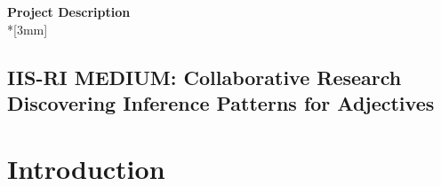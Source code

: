 \documentclass[10pt]{article}
\begin{document}
\begin{center}
{\LARGE{\bf Project Description}}\\*[3mm]
\vspace {-6mm}
 
\subsection*{IIS-RI MEDIUM: Collaborative Research\\
Discovering Inference Patterns for Adjectives}
\end{center}

\vspace {-2mm}

\section{\label{intro}Introduction}

\vspace {-3mm}
\end{document}
